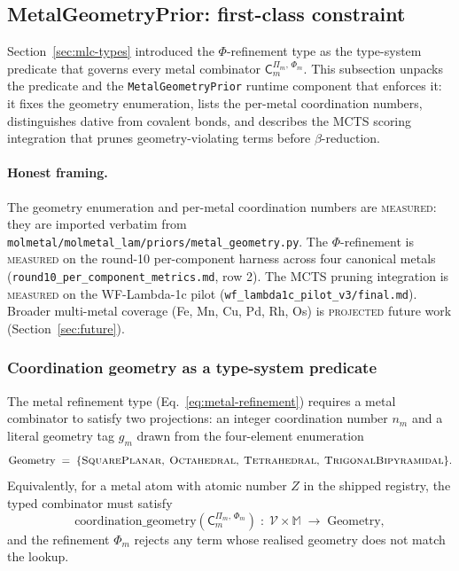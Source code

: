 \subsection{MetalGeometryPrior: first-class constraint}
\label{sec:metal-geometry-prior}

Section~\ref{sec:mlc-types} introduced the $\Phi$-refinement type as
the type-system predicate that governs every metal combinator
$\mathsf{C}_{m}^{\Pi_{m},\,\Phi_{m}}$. This subsection unpacks the
predicate and the
\texttt{MetalGeometryPrior} runtime component that enforces it: it
fixes the geometry enumeration, lists the per-metal coordination
numbers, distinguishes dative from covalent bonds, and describes
the MCTS scoring integration that prunes geometry-violating terms
before $\beta$-reduction.

\paragraph{Honest framing.}
The geometry enumeration and per-metal coordination numbers are
\textsc{measured}: they are imported verbatim from
\texttt{molmetal/molmetal\_lam/priors/metal\_geometry.py}. The
$\Phi$-refinement is \textsc{measured} on the round-10 per-component
harness across four canonical metals
(\texttt{round10\_per\_component\_metrics.md}, row 2).
The MCTS pruning integration is \textsc{measured} on the
WF-Lambda-1c pilot (\texttt{wf\_lambda1c\_pilot\_v3/final.md}).
Broader multi-metal coverage (Fe, Mn, Cu, Pd, Rh, Os) is
\textsc{projected} future work (Section~\ref{sec:future}).

\subsubsection{Coordination geometry as a type-system predicate}
\label{sec:metal-geom-enum}

The metal refinement type
(Eq.~\eqref{eq:metal-refinement}) requires a metal combinator to
satisfy two projections: an integer coordination number $n_m$ and
a literal geometry tag $g_m$ drawn from the four-element
enumeration
\begin{equation}
  \label{eq:geometry-enum}
  \mathrm{Geometry} \;=\; \{
    \textsc{SquarePlanar},\;
    \textsc{Octahedral},\;
    \textsc{Tetrahedral},\;
    \textsc{TrigonalBipyramidal}
  \}.
\end{equation}
Equivalently, for a metal atom with atomic number $Z$ in the
shipped registry, the typed combinator must satisfy
\begin{equation}
  \label{eq:coordination-geom-predicate}
  \mathrm{coordination\_geometry}(\mathsf{C}_{m}^{\Pi_{m},\,\Phi_{m}})
    \;:\; \mathcal{V} \times \mathbb{M}
      \;\longrightarrow\; \mathrm{Geometry},
\end{equation}
and the refinement $\Phi_{m}$ rejects any term whose realised
geometry does not match the lookup.

